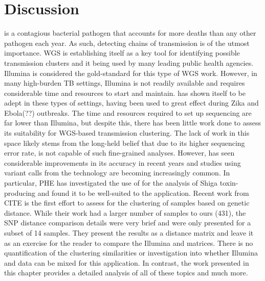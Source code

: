 
\section{Discussion}

\mtb{} is a contagious bacterial pathogen that accounts for more deaths than any other pathogen each year. As such, detecting chains of transmission is of the utmost importance. WGS is establishing itself as a key tool for identifying possible transmission clusters and it being used by many leading public health agencies. Illumina is considered the gold-standard for this type of WGS work. However, in many high-burden TB settings, Illumina is not readily available and requires considerable time and resources to start and maintain. \ont{} has shown itself to be adept in these types of settings, having been used to great effect during Zika and Ebola(??) outbreaks. The time and resources required to set up \ont{} sequencing are far lower than Illumina, but despite this, there has been little work done to assess its suitability for \mtb{} WGS-based transmission clustering. The lack of work in this space likely stems from the long-held belief that due to its higher sequencing error rate, \ont{} is not capable of such fine-grained analyses. However, \ont{} has seen considerable improvements in its accuracy in recent years and studies using variant calls from the technology are becoming increasingly common. In particular, PHE has investigated the use of \ont{} for the analysis of Shiga toxin-producing \ecoli{} and found it to be well-suited to the application. 
Recent work from CITE \etal{} is the first effort to assess \ont{} for the clustering of samples based on genetic distance. While their work had a larger number of samples to ours (431), the SNP distance comparison details were very brief and were only presented for a subset of 14 samples. They present the results as a distance matrix and leave it as an exercise for the reader to compare the Illumina and \ont{} matrices. There is no quantification of the clustering similarities or investigation into whether Illumina and \ont{} data can be mixed for this application. In contrast, the work presented in this chapter provides a detailed analysis of all of these topics and much more.

